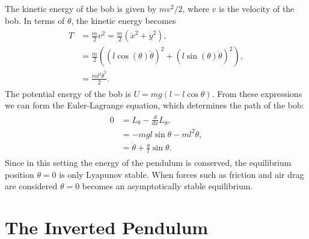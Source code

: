 The kinetic energy of the bob is given by $mv^2/2$, where $v$ is the velocity of the bob. 
In terms of $\theta$, the kinetic energy becomes 
\begin{align}
	\begin{split}
	T &= \frac{m}{2}v^2  = \frac{m}{2}(\dot{x}^2 + \dot{y}^2),\\
	&= \frac{m}{2}((l\cos(\theta)\dot{\theta})^2 + (l\sin(\theta)\dot{\theta})^2),\\
	&= \frac{ml^2\dot{\theta}^2}{2}.
	\end{split}
\end{align}
The potential energy of the bob is $U = mg(l-l\cos \theta)$. 
From these expressions we can form the Euler-Lagrange equation, which determines the path of the bob: 
\begin{align}
	\begin{split}
	0 &= L_{\theta} - \frac{d}{dx}L_{\dot{\theta}},\\
	&= -mgl\sin \theta - m l^2 \ddot{\theta},\\
	&= \ddot{\theta} + \frac{g}{l}\sin \theta.
	\end{split}
\end{align}
Since in this setting the energy of the pendulum is conserved, the equilibrium position $\theta = 0$ is only Lyapunov stable. When forces such as friction and air drag are considered $\theta = 0$ becomes an asymptotically stable equilibrium. 



%



\section*{The Inverted Pendulum}

